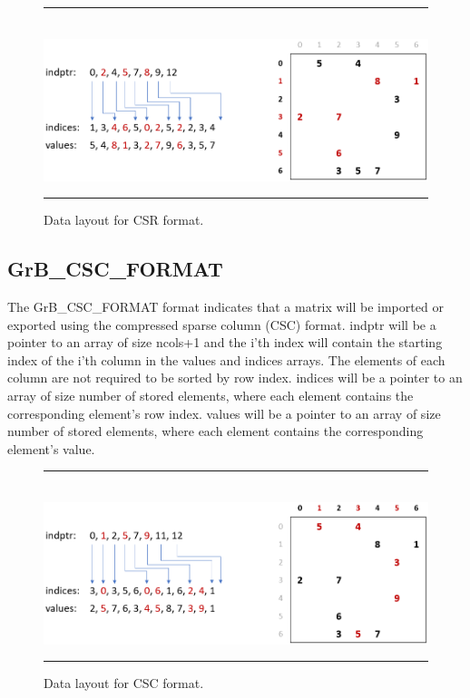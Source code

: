 \begin{figure}[h]
    \hrule
    \begin{center}
        ~\\
        \includegraphics[width=4.5in]{GrB_CSR_FORMAT.png}
    \end{center}
    \caption{Data layout for CSR format.}
    \label{Fig:formats}
    \hrule
\end{figure}

\subsection{{\sf GrB\_CSC\_FORMAT}}

The {\sf GrB\_CSC\_FORMAT} format
indicates that a matrix will be imported or exported using the compressed sparse
column (CSC) format.  {\sf indptr} will be a pointer to an array of size ncols+1
and the i'th index will contain the starting index of the i'th column in the {\sf values}
and {\sf indices} arrays.  The elements of each column are not required to be
sorted by row index.
{\sf indices} will be a pointer to an array of size number of
stored elements, where each element contains the corresponding element's row index.
{\sf values} will be a pointer to an array of size number of
stored elements, where each element contains the corresponding element's value.\\

\begin{figure}[h]
    \hrule
    \begin{center}
        ~\\
        \includegraphics[width=4.5in]{GrB_CSC_FORMAT.png}
    \end{center}
    \vspace{-1em}
    \caption{Data layout for CSC format.}
    \hrule
\end{figure}

